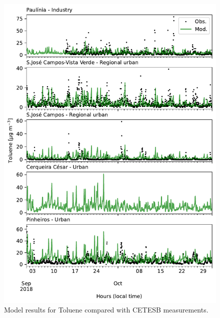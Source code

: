 \begin{figure}[hbt]
  \centering
  \includegraphics{fig/tseries_tol.pdf}
  \caption{Model results for Toluene compared with CETESB measurements.}
  \label{fig:tol}
\end{figure}

